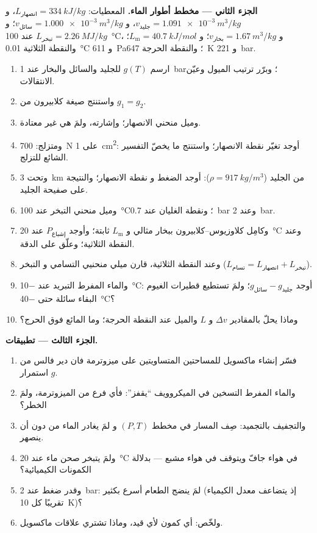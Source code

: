 \begin{problem}
\textbf{الجزء الثاني --- مخطط أطوار الماء.}
المعطيات: $L_{\text{انصهار}} = \qty{334}{kJ/kg}$، و $v_{\text{جليد}} = \qty{1.091e-3}{m^3/kg}$،
و $v_{\text{سائل}} = \qty{1.000e-3}{m^3/kg}$؛ و $L_{\text{تبخر}} = \qty{2.26}{MJ/kg}$ عند
\qty{100}{\celsius}، و $v_{\text{بخار}} = \qty{1.67}{m^3/kg}$؛ و $L_{\text{m}} = \qty{40.7}{kJ/mol}$؛
والنقطة الثلاثية \qty{0.01}{\celsius} و \qty{611}{Pa}؛ والنقطة الحرجة \qty{647}{K}
و \qty{221}{bar}.
\begin{enumerate}[resume]
  \item ارسم $g(T)$ للجليد والسائل والبخار عند \qty{1}{bar}؛ وبرّر
        ترتيب الميول وعيّن الانتقالات.
  \item واستنتج صيغة كلابيرون من $g_1 = g_2$.
  \item وميل منحني الانصهار؛ وإشارته، ولمَ هي غير معتادة.
  \item ومتزلج: \qty{700}{N} على \qty{1}{cm^2}: أوجد تغيّر نقطة
        الانصهار؛ واستنتج ما يخصّ التفسير الشائع للتزلج.
  \item وتحت \qty{3}{km} من الجليد ($\rho = \qty{917}{kg/m^3}$): أوجد الضغط و
        نقطة الانصهار؛ والنتيجة على صفيحة الجليد.
  \item وميل منحني التبخر عند \qty{100}{\celsius}؛ ونقطة الغليان
        عند \qty{0.7}{bar} وعند \qty{2}{bar}.
  \item وكامِل كلاوزيوس--كلابيرون ببخار مثالي و
        $L_{\text{m}}$ ثابتة؛ وأوجد $P_{\text{إشباع}}$ عند \qty{20}{\celsius} وعند
        النقطة الثلاثية؛ وعلّق على الدقة.
  \item وعند النقطة الثلاثية، قارن ميلي منحنيي التسامي و
        التبخر ($L_{\text{تسام}} = L_{\text{انصهار}} + L_{\text{تبخر}}$).
  \item والماء المفرط التبريد عند \qty{-10}{\celsius}: أوجد $g_{\text{سائل}} - g_{\text{جليد}}$؛
        ولمَ تستطيع قطيرات الغيوم البقاء سائلة حتى \qty{-40}{\celsius}؟
  \item وماذا يحلّ بالمقادير $\Delta v$ و $L$ والميل عند النقطة
        الحرجة؛ وما المائع فوق الحرج؟
\end{enumerate}

\textbf{الجزء الثالث --- تطبيقات.}
\begin{enumerate}[resume]
  \item فسّر إنشاء ماكسويل للمساحتين المتساويتين على ميزوترمة
        فان دير فالس من استمرار $g$.
  \item والماء المفرط التسخين في الميكروويف ``يقفز'': فأي فرع من
        الميزوترمة، ولمَ الخطر؟
  \item والتجفيف بالتجميد: صِف المسار في مخطط $(P,T)$ و
        لمَ يغادر الماء من دون أن ينصهر.
  \item ولمَ يتبخر صحن ماء عند \qty{20}{\celsius} في هواء جافّ
        ويتوقف في هواء مشبع --- بدلالة الكمونات الكيميائية؟
  \item وقدر ضغط عند \qty{2}{bar}: لمَ ينضج الطعام أسرع بكثير
        (إذ يتضاعف معدل الكيمياء تقريبًا كل
        \qty{10}{K})؟
  \item ولخّص: أي كمون لأي قيد، وماذا تشتري
        علاقات ماكسويل.
\end{enumerate}
\end{problem}
